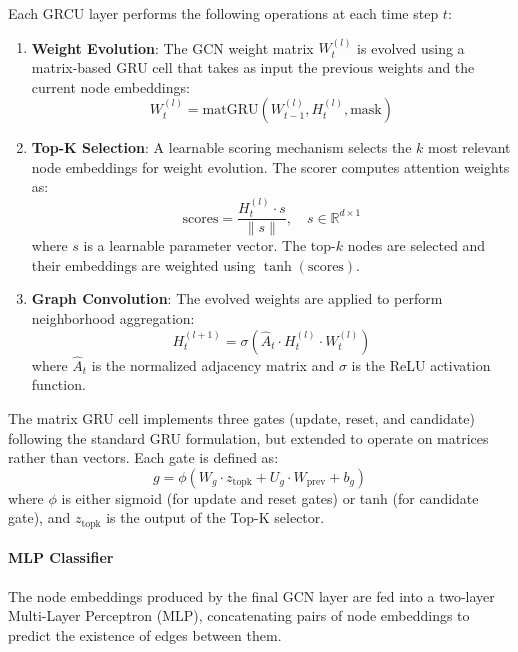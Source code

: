 Each GRCU layer performs the following operations at each time step $t$:

\begin{enumerate}
	\item \textbf{Weight Evolution}: The GCN weight matrix $W_t^{(l)}$ is evolved using a matrix-based GRU cell that takes as input the previous weights and the current node embeddings:
	      \begin{equation}
		      W_t^{(l)} = \text{matGRU}(W_{t-1}^{(l)}, H_t^{(l)}, \text{mask})
	      \end{equation}

	\item \textbf{Top-K Selection}: A learnable scoring mechanism selects the $k$ most relevant node embeddings for weight evolution. The scorer computes attention weights as:
	      \begin{equation}
		      \text{scores} = \frac{H_t^{(l)} \cdot s}{\|s\|}, \quad s \in \mathbb{R}^{d \times 1}
	      \end{equation}
	      where $s$ is a learnable parameter vector. The top-$k$ nodes are selected and their embeddings are weighted using $\tanh(\text{scores})$.

	\item \textbf{Graph Convolution}: The evolved weights are applied to perform neighborhood aggregation:
	      \begin{equation}
		      H_t^{(l+1)} = \sigma(\hat{A}_t \cdot H_t^{(l)} \cdot W_t^{(l)})
	      \end{equation}
	      where $\hat{A}_t$ is the normalized adjacency matrix and $\sigma$ is the ReLU activation function.
\end{enumerate}

The matrix GRU cell implements three gates (update, reset, and candidate) following the standard GRU formulation, but extended to operate on matrices rather than vectors. Each gate is defined as:
\begin{equation}
	g = \phi(W_g \cdot z_{\text{topk}} + U_g \cdot W_{\text{prev}} + b_g)
\end{equation}
where $\phi$ is either sigmoid (for update and reset gates) or tanh (for candidate gate), and $z_{\text{topk}}$ is the output of the Top-K selector.

\paragraph{MLP Classifier}

The node embeddings produced by the final GCN layer are fed into a two-layer Multi-Layer Perceptron (MLP), concatenating pairs of node embeddings to predict the existence of edges between them.


